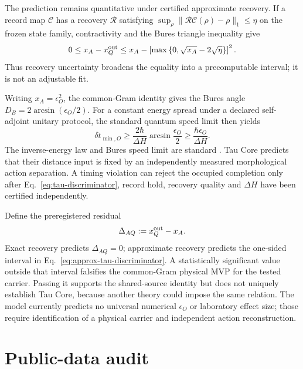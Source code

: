 \documentclass[11pt]{article}
\begin{document}
The prediction remains quantitative under certified approximate recovery.
If a record map $\mathcal C$ has a recovery $\mathcal R$ satisfying
$\sup_\rho\|\mathcal R\mathcal C(\rho)-\rho\|_1\le\eta$ on the frozen state
family, contractivity and the Bures triangle inequality give
\begin{equation}
 0\le x_A-x_Q^{\rm out}
 \le x_A-
 \left[\max\left\{0,\sqrt{x_A}-2\sqrt\eta\right\}\right]^2.
 \label{eq:approx-tau-discriminator}
\end{equation}
Thus recovery uncertainty broadens the equality into a precomputable interval;
it is not an adjustable fit.

Writing $x_A=\epsilon_O^2$, the common-Gram identity gives the Bures angle
$D_B=2\arcsin(\epsilon_O/2)$.  For a constant energy spread under a declared
self-adjoint unitary protocol, the standard quantum speed limit then yields
\begin{equation}
 \delta t_{\min,O}\ge
 \frac{2\hbar}{\Delta H}\arcsin\frac{\epsilon_O}{2}
 \ge\frac{\hbar\epsilon_O}{\Delta H}.
 \label{eq:qor-discriminator}
\end{equation}
The inverse-energy law and Bures speed limit are standard
\citep{MandelstamTamm1945,AnandanAharonov1990}.  Tau Core predicts that their
distance input is fixed by an independently measured morphological action
separation.  A timing violation can reject the occupied completion only after
Eq.~\eqref{eq:tau-discriminator}, record hold, recovery quality and $\Delta H$
have been certified independently.

Define the preregistered residual
\begin{equation}
 \Delta_{AQ}:=x_Q^{\rm out}-x_A.
\end{equation}
Exact recovery predicts $\Delta_{AQ}=0$; approximate recovery predicts the
one-sided interval in Eq.~\eqref{eq:approx-tau-discriminator}.  A statistically
significant value outside that interval falsifies the common-Gram physical
MVP for the tested carrier.  Passing it supports the shared-source identity
but does not uniquely establish Tau Core, because another theory could impose
the same relation.  The model currently predicts no universal numerical
$\epsilon_O$ or laboratory effect size; those require identification of a
physical carrier and independent action reconstruction.

\section{Public-data audit}
\end{document}

